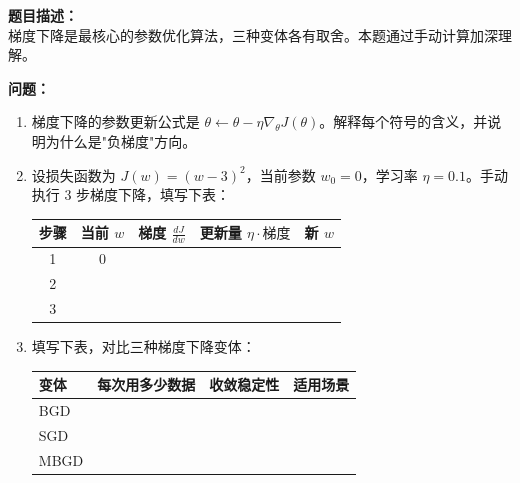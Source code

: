 \documentclass[a4paper,11pt]{ctexart}
\begin{document}
\begin{problembox}
    \textbf{题目描述：}\\
    梯度下降是最核心的参数优化算法，三种变体各有取舍。本题通过手动计算加深理解。

    \vspace{0.2cm}
    \textbf{问题：}
    \begin{enumerate}[(1)]
        \item 梯度下降的参数更新公式是 $\theta \leftarrow \theta - \eta \nabla_\theta J(\theta)$。解释每个符号的含义，并说明为什么是"负梯度"方向。

        \item 设损失函数为 $J(w) = (w - 3)^2$，当前参数 $w_0 = 0$，学习率 $\eta = 0.1$。手动执行 3 步梯度下降，填写下表：

        \begin{center}
        \begin{tabular}{ccccc}
            \toprule
            步骤 & 当前 $w$ & 梯度 $\frac{dJ}{dw}$ & 更新量 $\eta \cdot \text{梯度}$ & 新 $w$ \\
            \midrule
            1 & 0 & \underline{\quad} & \underline{\quad} & \underline{\quad} \\
            2 & \underline{\quad} & \underline{\quad} & \underline{\quad} & \underline{\quad} \\
            3 & \underline{\quad} & \underline{\quad} & \underline{\quad} & \underline{\quad} \\
            \bottomrule
        \end{tabular}
        \end{center}

        \item 填写下表，对比三种梯度下降变体：
        \begin{center}
        \begin{tabular}{p{2.8cm} p{2.5cm} p{3cm} p{3.5cm}}
            \toprule
            变体 & 每次用多少数据 & 收敛稳定性 & 适用场景 \\
            \midrule
            BGD & \underline{\hspace{2cm}} & \underline{\hspace{2.5cm}} & \underline{\hspace{3cm}} \\[1.2em]
            SGD & \underline{\hspace{2cm}} & \underline{\hspace{2.5cm}} & \underline{\hspace{3cm}} \\[1.2em]
            MBGD & \underline{\hspace{2cm}} & \underline{\hspace{2.5cm}} & \underline{\hspace{3cm}} \\
            \bottomrule
        \end{tabular}
        \end{center}


\end{enumerate}
\end{problembox}
\end{document}
